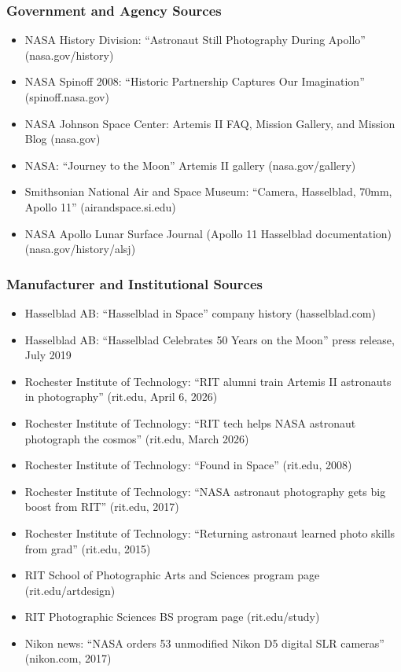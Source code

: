\documentclass[11pt,letterpaper]{article}
\begin{document}
\subsubsection{Government and Agency Sources}
\begin{itemize}[leftmargin=1.5em]
  \item NASA History Division: ``Astronaut Still Photography During Apollo'' (nasa.gov/history)
  \item NASA Spinoff 2008: ``Historic Partnership Captures Our Imagination'' (spinoff.nasa.gov)
  \item NASA Johnson Space Center: Artemis II FAQ, Mission Gallery, and Mission Blog (nasa.gov)
  \item NASA: ``Journey to the Moon'' Artemis II gallery (nasa.gov/gallery)
  \item Smithsonian National Air and Space Museum: ``Camera, Hasselblad, 70mm, Apollo 11'' (airandspace.si.edu)
  \item NASA Apollo Lunar Surface Journal (Apollo 11 Hasselblad documentation) (nasa.gov/history/alsj)
\end{itemize}

\subsubsection{Manufacturer and Institutional Sources}
\begin{itemize}[leftmargin=1.5em]
  \item Hasselblad AB: ``Hasselblad in Space'' company history (hasselblad.com)
  \item Hasselblad AB: ``Hasselblad Celebrates 50 Years on the Moon'' press release, July 2019
  \item Rochester Institute of Technology: ``RIT alumni train Artemis II astronauts in photography'' (rit.edu, April 6, 2026)
  \item Rochester Institute of Technology: ``RIT tech helps NASA astronaut photograph the cosmos'' (rit.edu, March 2026)
  \item Rochester Institute of Technology: ``Found in Space'' (rit.edu, 2008)
  \item Rochester Institute of Technology: ``NASA astronaut photography gets big boost from RIT'' (rit.edu, 2017)
  \item Rochester Institute of Technology: ``Returning astronaut learned photo skills from grad'' (rit.edu, 2015)
  \item RIT School of Photographic Arts and Sciences program page (rit.edu/artdesign)
  \item RIT Photographic Sciences BS program page (rit.edu/study)
  \item Nikon news: ``NASA orders 53 unmodified Nikon D5 digital SLR cameras'' (nikon.com, 2017)
\end{itemize}
\end{document}
